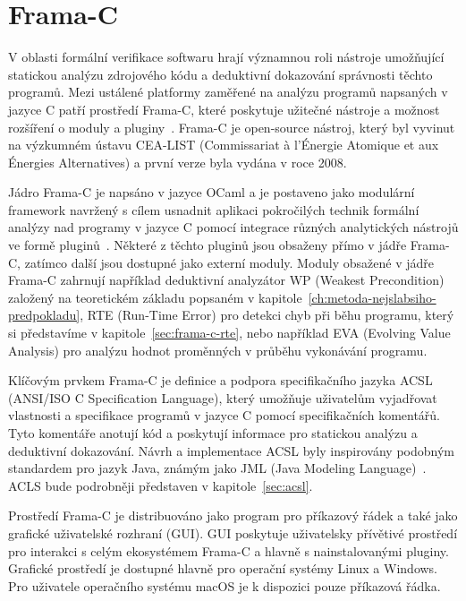 \chapter{Frama-C}
\label{ch:frama-c}

V oblasti formální verifikace softwaru hrají významnou roli nástroje umožňující
statickou analýzu zdrojového kódu a deduktivní dokazování správnosti těchto programů.
Mezi ustálené platformy zaměřené na analýzu programů napsaných v jazyce C patří prostředí Frama\mbox{-}C,
které poskytuje užitečné nástroje a možnost rozšíření o moduly a pluginy~\cite{FCKernelMaroneze2024}.
Frama\mbox{-}C je open-source nástroj, který byl vyvinut na výzkumném ústavu CEA-LIST (Commissariat à l'Énergie Atomique et aux Énergies Alternatives)
a první verze byla vydána v roce 2008.

Jádro Frama\mbox{-}C je napsáno v jazyce OCaml a je postaveno jako modulární framework
navržený s cílem usnadnit aplikaci pokročilých technik formální analýzy nad programy v jazyce C
pomocí integrace různých analytických nástrojů ve formě pluginů~\cite{FCPluginDevSignoles2024}.
Některé z těchto pluginů jsou obsaženy přímo v jádře Frama\mbox{-}C, zatímco další jsou dostupné jako externí moduly.
Moduly obsažené v jádře Frama\mbox{-}C zahrnují například deduktivní analyzátor WP (Weakest Precondition)
založený na teoretickém základu popsaném v kapitole~\ref{ch:metoda-nejslabsiho-predpokladu},
RTE (Run-Time Error) pro detekci chyb při běhu programu, který si představíme v kapitole~\ref{sec:frama-c-rte},
nebo například EVA (Evolving Value Analysis) pro analýzu hodnot proměnných v průběhu vykonávání programu.

Klíčovým prvkem Frama\mbox{-}C je definice a podpora specifikačního jazyka ACSL (ANSI/ISO C Specification Language),
který umožňuje uživatelům vyjadřovat vlastnosti a specifikace programů v jazyce C pomocí specifikačních komentářů.
Tyto komentáře anotují kód a poskytují informace pro statickou analýzu a deduktivní dokazování.
Návrh a implementace ACSL byly inspirovány podobným standardem pro jazyk Java, známým jako JML (Java Modeling Language)~\cite{ACSLSpec}.
ACLS bude podrobněji představen v kapitole~\ref{sec:acsl}.

Prostředí Frama\mbox{-}C je distribuováno jako program pro příkazový řádek a také jako grafické uživatelské rozhraní (GUI).
GUI poskytuje uživatelsky přívětivé prostředí pro interakci s celým ekosystémem Frama\mbox{-}C a hlavně s nainstalovanými pluginy.
Grafické prostředí je dostupné hlavně pro operační systémy Linux a Windows.
Pro uživatele operačního systému macOS je k dispozici pouze příkazová řádka.


